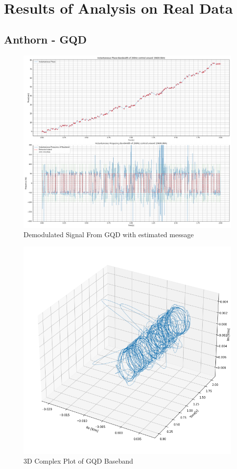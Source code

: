 \renewcommand{\thefigure}{A.\arabic{figure}}
\chapter{Results of Analysis on Real Data}
\section{Anthorn - \textbf{GQD}}
\begin{figure}[H]
    \centering
    \includegraphics[width = \textwidth]{figs/AppA/GQD.png}
    \caption{Demodulated Signal From GQD with estimated message}
    \label{fig:my_label}
\end{figure}
\begin{figure}[H]
    \centering
    \includegraphics[width = \textwidth]{figs/AppA/gqd3D.png}
    \caption{3D Complex Plot of GQD Baseband}
    \label{fig:my_label}
\end{figure}

